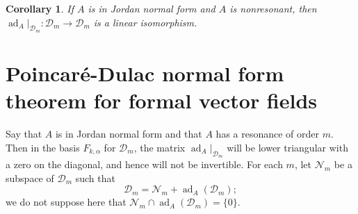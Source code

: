 \documentclass{article}
\newtheorem{corollary}[theorem]{Corollary}
\newcommand{\ad}{\operatorname{ad}}
\begin{document}
\begin{corollary}
\label{invertible}
If $A$ is in Jordan normal form and $A$ is nonresonant, then $\ad_A|_{\mathscr{D}_m}:\mathscr{D}_m \to \mathscr{D}_m$ is a linear isomorphism.
\end{corollary}

\section{Poincar\'e-Dulac normal form theorem for formal vector fields}
Say that $A$ is in Jordan normal form and that $A$ has a resonance of order $m$. Then in the basis $F_{k,\alpha}$ for $\mathscr{D}_m$,
the matrix $\ad_A|_{\mathscr{D}_m}$ will be lower triangular with a zero on the diagonal, and hence will not be invertible. For each $m$, let $\mathscr{N}_m$ be a subspace of $\mathscr{D}_m$ such that
\[
\mathscr{D}_m=\mathscr{N}_m + \ad_A(\mathscr{D}_m);
\]
we do not suppose here that $\mathscr{N}_m \cap  \ad_A(\mathscr{D}_m)=\{0\}$.
\end{document}
